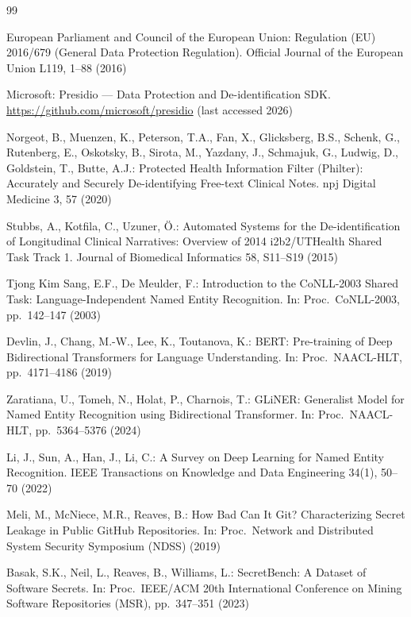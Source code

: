 \documentclass[runningheads]{llncs}
\begin{document}
\begin{thebibliography}{99}

European Parliament and Council of the European Union:
Regulation (EU) 2016/679 (General Data Protection Regulation).
Official Journal of the European Union L119, 1--88 (2016)

Microsoft: Presidio --- Data Protection and De-identification SDK.
\url{https://github.com/microsoft/presidio} (last accessed 2026)

Norgeot, B., Muenzen, K., Peterson, T.A., Fan, X., Glicksberg, B.S., Schenk, G.,
Rutenberg, E., Oskotsky, B., Sirota, M., Yazdany, J., Schmajuk, G., Ludwig, D.,
Goldstein, T., Butte, A.J.:
Protected Health Information Filter (Philter): Accurately and Securely
De-identifying Free-text Clinical Notes. npj Digital Medicine 3, 57 (2020)

Stubbs, A., Kotfila, C., Uzuner, \"{O}.:
Automated Systems for the De-identification of Longitudinal Clinical Narratives:
Overview of 2014 i2b2/UTHealth Shared Task Track 1.
Journal of Biomedical Informatics 58, S11--S19 (2015)

Tjong Kim Sang, E.F., De Meulder, F.:
Introduction to the CoNLL-2003 Shared Task: Language-Independent Named Entity
Recognition. In: Proc.\ CoNLL-2003, pp.\ 142--147 (2003)

Devlin, J., Chang, M.-W., Lee, K., Toutanova, K.:
BERT: Pre-training of Deep Bidirectional Transformers for Language Understanding.
In: Proc.\ NAACL-HLT, pp.\ 4171--4186 (2019)

Zaratiana, U., Tomeh, N., Holat, P., Charnois, T.:
GLiNER: Generalist Model for Named Entity Recognition using Bidirectional
Transformer. In: Proc.\ NAACL-HLT, pp.\ 5364--5376 (2024)

Li, J., Sun, A., Han, J., Li, C.:
A Survey on Deep Learning for Named Entity Recognition.
IEEE Transactions on Knowledge and Data Engineering 34(1), 50--70 (2022)

Meli, M., McNiece, M.R., Reaves, B.:
How Bad Can It Git? Characterizing Secret Leakage in Public GitHub Repositories.
In: Proc.\ Network and Distributed System Security Symposium (NDSS) (2019)

Basak, S.K., Neil, L., Reaves, B., Williams, L.:
SecretBench: A Dataset of Software Secrets.
In: Proc.\ IEEE/ACM 20th International Conference on Mining Software Repositories
(MSR), pp.\ 347--351 (2023)


\end{thebibliography}
\end{document}
